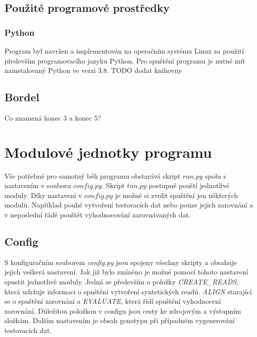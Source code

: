 \documentclass[czech,DP]{thesiskiv}
\numberwithin{equation}{section}
\begin{document}
\subsection{Použité programové prostředky}
\subsubsection{Python}
Program byl navržen a implementován na operačním systému Linux za použití především programovacího jazyku Python. 
 Pro spuštění programu je nutné mít nainstalovaný Python ve verzi 3.8.
 TODO dodat knihovny 


\subsection{Bordel}
Co znamená konec 3 a konec 5? 




\section{Modulové jednotky programu}
Vše potřebné pro samotný běh programu obstarává skript $run.py$ spolu s nastavením v souboru $config.py$. Skript $tun.py$ postupně pouští jednotlivé moduly. Díky nastavení v $config.py$ je možné si zvolit spuštění jen některých modulů. Například pouhé vytvoření testovacích dat nebo pouze jejich zarovnání a v neposlední řádě pouštět vyhodnocování zarovnávaných dat.

\subsection{Config}
S konfiguračním souborem \textit{config.py} jsou spojeny všechny skripty a obsahuje jejich veškerá nastavení. Jak již bylo zmíněno je možné pomocí tohoto nastavení spustit jednotlivé moduly. Jedná se především o položky \textit{CREATE\_READS}, která udržuje informaci o spuštění vytvoření syntetických readů. \textit{ALIGN} starající se o spuštění zarovnání a \textit{EVALUATE}, která řídí spuštění vyhodnocení zarovnání. Důležitou položkou v configu jsou cesty ke zdrojovým a výstupním složkám. Dalším nastavením je obsah genotypu při případném vygenerování testovacích dat.
\end{document}
